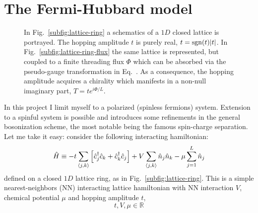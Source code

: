 \clearpage
\section{The Fermi-Hubbard model}

\begin{figure}
	\centering
	\hfil
	\caption{In Fig.~\ref{subfig:lattice-ring} a schematics of a $1D$ closed lattice is portrayed. The hopping amplitude $t$ is purely real, $t = \mathrm{sgn}(t) \abs{t}$. In Fig.~\ref{subfig:lattice-ring-flux} the same lattice is represented, but coupled to a finite threading flux $\Phi$ which can be absorbed via the pseudo-gauge transformation in Eq.~\todo. As a consequence, the hopping amplitude acquires a chirality which manifests in a non-null imaginary part, $T = t e^{i\Phi/L}$.}
	\label{fig:lattice-rings}
\end{figure}

In this project I limit myself to a polarized (spinless fermions) system. Extension to a spinful system is possible and introduces some refinements in the general bosonization scheme, the most notable being the famous spin-charge separation. Let me take it easy: consider the following interacting hamiltonian:
\begin{equation}\label{eq:spinless-hamiltonian-pbc}
	\hat H \equiv -t \sum_{\ev{j,k}} \left[
		\hat c_j^\dagger \hat c_k + \hat c_k^\dagger \hat c_j 
	\right] + V \sum_{\ev{j,k}} \hat n_j \hat n_k - \mu \sum_{j=1}^L \hat n_j
\end{equation}
defined on a closed $1D$ lattice ring, as in Fig.~\ref{subfig:lattice-ring}.
This is a simple nearest-neighbors (NN) interacting lattice hamiltonian with NN interaction $V$, chemical potential $\mu$ and hopping amplitude $t$,
\[
	t, V, \mu \in \mathbb{R}
\]

